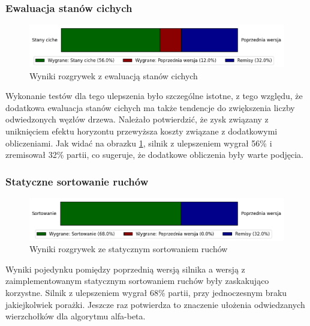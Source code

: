 \subsubsection{Ewaluacja stanów cichych}
\begin{figure}[ht]
    \centering
    \includegraphics[width=1\linewidth]{rozdzialy/rozdzial03/1_porownanie-wersji-silnika/rysunki/wyniki-stany-ciche}
    \caption{Wyniki rozgrywek z ewaluacją stanów cichych}
    \label{fig:wyniki-stany-ciche}
\end{figure}
Wykonanie testów dla tego ulepszenia było szczególne istotne, z tego względu, że dodatkowa ewaluacja stanów cichych ma także tendencje do zwiększenia liczby odwiedzonych węzłów drzewa.
Należało potwierdzić, że zysk związany z uniknięciem efektu horyzontu przewyższa koszty związane z dodatkowymi obliczeniami.
Jak widać na obrazku \ref{fig:wyniki-stany-ciche}, silnik z ulepszeniem wygrał 56\% i zremisował 32\% partii, co sugeruje, że dodatkowe obliczenia były warte podjęcia.

\subsubsection{Statyczne sortowanie ruchów}

\begin{figure}[ht]
    \centering
    \includegraphics[width=1\linewidth]{rozdzialy/rozdzial03/1_porownanie-wersji-silnika/rysunki/wyniki-sortowanie}
    \caption{Wyniki rozgrywek ze statycznym sortowaniem ruchów}
    \label{fig:wyniki-sortowanie}
\end{figure}
Wyniki pojedynku pomiędzy poprzednią wersją silnika a wersją z zaimplementowanym statycznym sortowaniem ruchów były zaskakująco korzystne.
Silnik z ulepszeniem wygrał 68\% partii, przy jednoczesnym braku jakiejkolwiek porażki.
Jeszcze raz potwierdza to znaczenie ułożenia odwiedzanych wierzchołków dla algorytmu alfa-beta.

